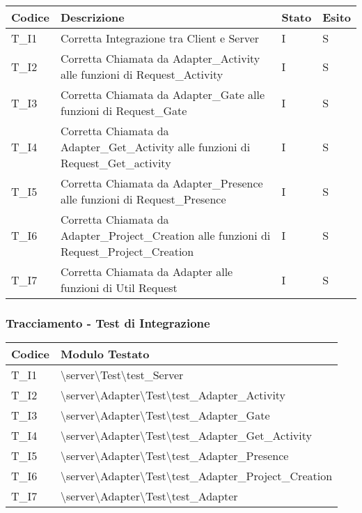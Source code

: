 \begin{tabular}{ |m{3em}|m{26em}|m{3em}|m{3em}| }
  \hline
  \textbf{Codice} & \textbf{Descrizione}  & \textbf{Stato} & \textbf{Esito}\\
  \hline
  T\_I1 & Corretta Integrazione tra Client e Server & I & S \\
  \hline
  T\_I2 & Corretta Chiamata da Adapter\_Activity alle funzioni di Request\_Activity & I & S \\
  \hline
  T\_I3 & Corretta Chiamata da Adapter\_Gate alle funzioni di Request\_Gate & I & S \\
  \hline
  T\_I4 & Corretta Chiamata da Adapter\_Get\_Activity alle funzioni di Request\_Get\_activity & I & S \\
  \hline
  T\_I5 & Corretta Chiamata da Adapter\_Presence alle funzioni di Request\_Presence & I & S \\
  \hline
  T\_I6 & Corretta Chiamata da Adapter\_Project\_Creation alle funzioni di Request\_Project\_Creation & I & S \\
  \hline
  T\_I7 & Corretta Chiamata da Adapter alle funzioni di Util Request & I & S \\
  \hline

\end{tabular}
\subsubsection{Tracciamento - Test di Integrazione}
\renewcommand{\arraystretch}{1.8}
\begin{tabular}{|m{6em}|m{33em}|}
    \hline
    \textbf{Codice} & \textbf{Modulo Testato} \\
    \hline
    T\_I1 & \textbackslash server\textbackslash Test\textbackslash test\_Server\\
    \hline
    T\_I2 & \textbackslash server\textbackslash Adapter\textbackslash Test\textbackslash test\_Adapter\_Activity  \\
    \hline
    T\_I3 & \textbackslash server\textbackslash Adapter\textbackslash Test\textbackslash test\_Adapter\_Gate \\
    \hline
    T\_I4 & \textbackslash server\textbackslash Adapter\textbackslash Test\textbackslash test\_Adapter\_Get\_Activity \\
    \hline
    T\_I5 & \textbackslash server\textbackslash Adapter\textbackslash Test\textbackslash test\_Adapter\_Presence  \\
    \hline
    T\_I6 & \textbackslash server\textbackslash Adapter\textbackslash Test\textbackslash test\_Adapter\_Project\_Creation  \\
    \hline 
    T\_I7 &  \textbackslash server\textbackslash Adapter\textbackslash Test\textbackslash test\_Adapter \\
    \hline 
\end{tabular}

